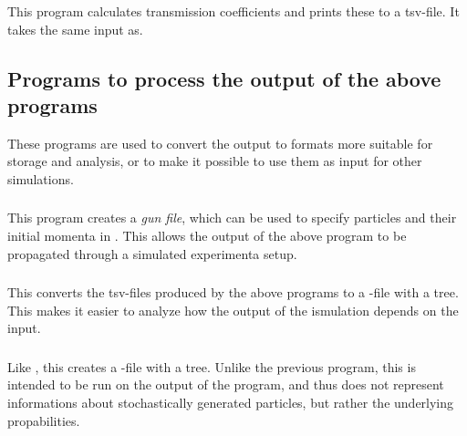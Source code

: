 \subsubsection{}
This program calculates transmission coefficients and prints these to a tsv-file. It takes the same input as.


\subsection{Programs to process the output of the above programs}
These programs are used to convert the output to formats more suitable for storage and analysis, or to make it possible to use them as input for other simulations.
\subsubsection{}
This program creates a  \emph{gun file}, which can be used to specify particles and their initial momenta in . This allows the output of the above program to be propagated through a simulated experimenta setup.

\subsubsection{}
This converts the tsv-files produced by the above programs to a -file with a tree. This makes it easier to analyze how the output of the ismulation depends on the input.

\subsubsection{}
Like , this creates a -file with a tree. Unlike the previous program, this is intended to be run on the output of the  program, and thus does not represent informations about stochastically generated particles, but rather the underlying propabilities.

